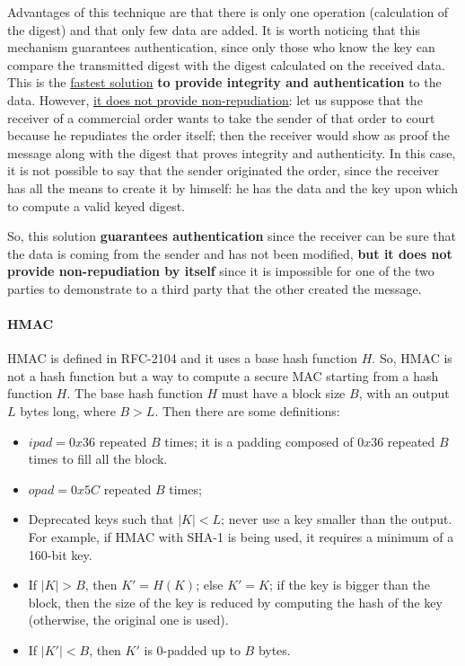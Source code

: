 Advantages of this technique are that there is only one operation (calculation of the digest) and that only few data are added. It is worth noticing that this mechanism guarantees authentication, since only those who know the key can compare the transmitted digest with the digest calculated on the received data. This is the \underline{fastest solution} \textbf{to provide integrity and authentication} to the data. However, \underline{it does not provide non-repudiation}: let us suppose that the receiver of a commercial order wants to take the sender of that order to court because he repudiates the order itself; then the receiver would show as proof the message along with the digest that proves integrity and authenticity. In this case, it is not possible to say that the sender originated the order, since the receiver has all the means to create it by himself: he has the data and the key upon which to compute a valid keyed digest.

So, this solution \textbf{guarantees authentication} since the receiver can be sure that the data is coming from the sender and has not been modified, \textbf{but it does not provide non-repudiation by itself} since it is impossible for one of the two parties to demonstrate to a third party that the other created the message.


\paragraph{HMAC}
HMAC is defined in RFC-2104 and it uses a base hash function \(H\). So, HMAC is not a hash function but a way to compute a secure MAC starting from a hash function \(H\). The base hash function \(H\) must have a block size \(B\), with an output \(L\) bytes long, where \(B > L\). Then there are some definitions:
\begin{itemize}
	\item \(ipad = 0x36\) repeated \(B\) times; it is a padding composed of \(0x36\) repeated \(B\) times to fill all the block.
	\item \(opad = 0x5C\) repeated \(B\) times;
	\item Deprecated keys such that \(|K| < L\); never use a key smaller than the output. For example, if HMAC with SHA-1 is being used, it requires a minimum of a 160-bit key.
	\item If \(|K| > B\), then \(K' = H(K)\); else \(K' = K\); if the key is bigger than the block, then the size of the key is reduced by computing the hash of the key (otherwise, the original one is used).
	\item If \(|K'| < B\), then \(K'\) is 0-padded up to \(B\) bytes.
\end{itemize}

